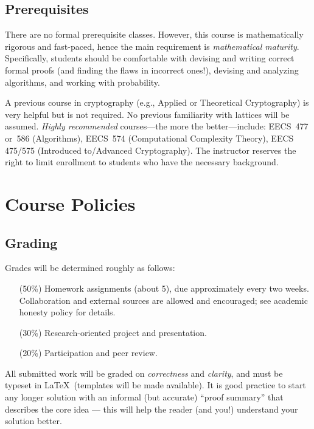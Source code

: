 \documentclass[11pt]{article}
\begin{document}
\subsection{Prerequisites}
\label{sec:prerequisites}

There are no formal prerequisite classes.  However, this course is
mathematically rigorous and fast-paced, hence the main requirement is
\emph{mathematical maturity}.  Specifically, students should be
comfortable with devising and writing correct formal proofs (and
finding the flaws in incorrect ones!), devising and analyzing
algorithms, and working with probability.

A previous course in cryptography (e.g., Applied or Theoretical
Cryptography) is very helpful but is not required.  No previous
familiarity with lattices will be assumed.  \emph{Highly recommended}
courses---the more the better---include: EECS~477 or~586 (Algorithms),
EECS~574 (Computational Complexity Theory), EECS 475/575 (Introduced
to/Advanced Cryptography).  The instructor reserves the right to limit
enrollment to students who have the necessary background.

\section{Course Policies}
\label{sec:policies}

\subsection{Grading}
\label{sec:grading}

Grades will be determined roughly as follows:
\begin{itemize}
\item[(50\%)] Homework assignments (about 5), due approximately every
  two weeks.  Collaboration and external sources are allowed and
  encouraged; see academic honesty policy for details.

\item[(30\%)] Research-oriented project and presentation.

\item[(20\%)] Participation and peer review.
\end{itemize}

All submitted work will be graded on \emph{correctness} and
\emph{clarity}, and must be typeset in \LaTeX\ (templates will be made
available).  It is good practice to start any longer solution with an
informal (but accurate) ``proof summary'' that describes the core idea
--- this will help the reader (and you!)  understand your solution
better.
\end{document}
